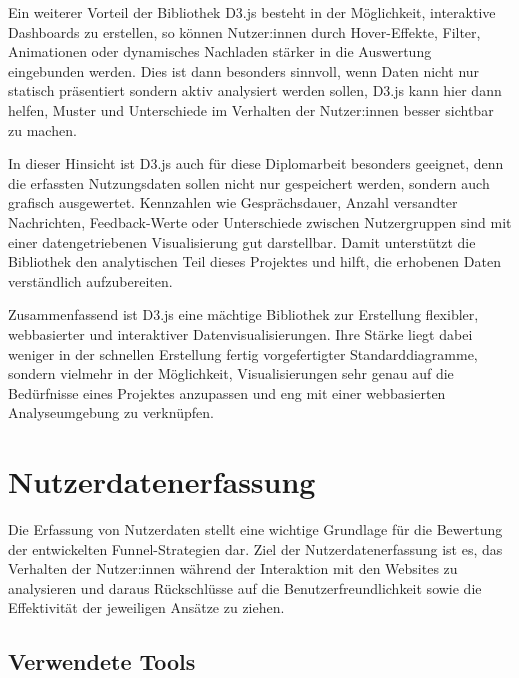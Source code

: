 Ein weiterer Vorteil der Bibliothek D3.js besteht in der Möglichkeit, interaktive 
Dashboards zu erstellen, so können Nutzer:innen durch Hover-Effekte, Filter, 
Animationen oder dynamisches Nachladen stärker in die Auswertung eingebunden 
werden. Dies ist dann besonders sinnvoll, wenn Daten nicht nur statisch 
präsentiert sondern aktiv analysiert werden sollen, D3.js kann hier dann helfen, 
Muster und Unterschiede im Verhalten der Nutzer:innen besser sichtbar zu machen.

In dieser Hinsicht ist D3.js auch für diese Diplomarbeit besonders geeignet, 
denn die erfassten Nutzungsdaten sollen nicht nur gespeichert werden, sondern 
auch grafisch ausgewertet. Kennzahlen wie Gesprächsdauer, Anzahl versandter 
Nachrichten, Feedback-Werte oder Unterschiede zwischen Nutzergruppen sind mit 
einer datengetriebenen Visualisierung gut darstellbar. Damit unterstützt die 
Bibliothek den analytischen Teil dieses Projektes und hilft, die erhobenen Daten 
verständlich aufzubereiten.

Zusammenfassend ist D3.js eine mächtige Bibliothek zur Erstellung flexibler, 
webbasierter und interaktiver Datenvisualisierungen. Ihre Stärke liegt dabei 
weniger in der schnellen Erstellung fertig vorgefertigter Standarddiagramme, 
sondern vielmehr in der Möglichkeit, Visualisierungen sehr genau auf die 
Bedürfnisse eines Projektes anzupassen und eng mit einer webbasierten 
Analyseumgebung zu verknüpfen.
\cite{D3Home}

\setauthor{\firstauthor}
\section{Nutzerdatenerfassung}

Die Erfassung von Nutzerdaten stellt eine wichtige Grundlage 
für die Bewertung der entwickelten Funnel-Strategien dar. Ziel der 
Nutzerdatenerfassung ist es, das Verhalten der Nutzer:innen während der 
Interaktion mit den Websites zu analysieren und daraus 
Rückschlüsse auf die Benutzerfreundlichkeit sowie die Effektivität der 
jeweiligen Ansätze zu ziehen.

\setauthor{\firstauthor}
\subsection{Verwendete Tools}

